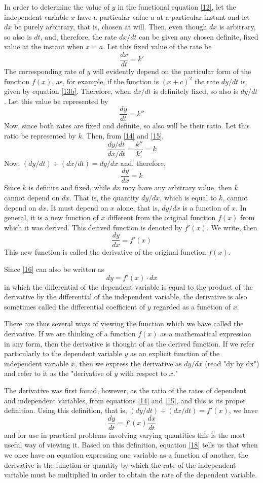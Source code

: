 In order to determine the value of $y$ in the functional equation \eqref{12}, let the independent variable $x$ have a particular value $a$ at a particular instant and let $dx$ be purely arbitrary, that is, chosen at will. Then, even though $dx$ is arbitrary, so also is $dt$, and, therefore, the rate $dx/dt$ can be given any chosen definite, fixed value at the instant when $x = a$. Let this fixed value of the rate be
\[\frac{dx}{dt} = k' \tag{14} \label{14}\]
The corresponding rate of $y$ will evidently depend on the particular form of the function $f(x)$, as, for example, if the function is $(x+c)^2$ the rate $dy/dt$ is given by equation \eqref{13b}. Therefore, when $dx/dt$ is definitely fixed, so also is $dy/dt$.
Let this value be represented by
\[\frac{dy}{dt} = k'' \tag{15} \label{15}\]
Now, since both rates are fixed and definite, so also will be their ratio. Let this ratio be represented by $k$. Then, from \eqref{14} and \eqref{15},
\[\frac{dy/dt}{dx/dt} = \frac{k''}{k'} = k\]
Now, $(dy/dt) \div (dx/dt) = dy/dx$ and, therefore,
\[\frac{dy}{dx} = k \]
Since $k$ is definite and fixed, while $dx$ may have any arbitrary value, then $k$ cannot depend on $dx$. That is, the quantity $dy/dx$, which is equal to $k$, cannot depend on $dx$. It must depend on $x$ alone, that is, $dy/dx$ is a function of $x$. In general, it is a new function of $x$ different from the original function $f(x)$ from which it was derived. This derived function is denoted by $f'(x)$. We write, then
\[\frac{dy}{dx} = f'(x) \tag{16} \label{16}\]
This new function is called the derivative of the original function $f(x)$.

Since \eqref{16} can also be written as
\[dy =f'(x) \cdot dx \tag{17} \label{17}\]
in which the differential of the dependent variable is equal to the product of the derivative by the differential of the independent variable, the derivative is also sometimes called the differential coefficient of $y$ regarded as a function of $x$.

There are thus several ways of viewing the function which we have called the derivative. If we are thinking of a function $f(x)$ as a mathematical expression in any form, then the derivative is thought of as the derived function. If we refer particularly to the dependent variable $y$ as an explicit function of the independent variable $x$, then we express the derivative as $dy/dx$ (read "dy by dx") and refer to it as the "derivative of $y$ with respect to $x$."

The derivative was first found, however, as the ratio of the rates of dependent and independent variables, from equations \eqref{14} and \eqref{15}, and this is its proper definition. Using this definition, that is, $(dy/dt) \div (dx/dt) = f'(x)$, we have
\[\frac{dy}{dt} = f'(x) \frac{dx}{dt} \tag{18} \label{18}\]
and for use in practical problems involving varying quantities this is the most useful way of viewing it. Based on this definition, equation \eqref{18} tells us that when we once have an equation expressing one variable as a function of another, the derivative is the function or quantity by which the rate of the independent variable must be multiplied in order to obtain the rate of the dependent variable.

